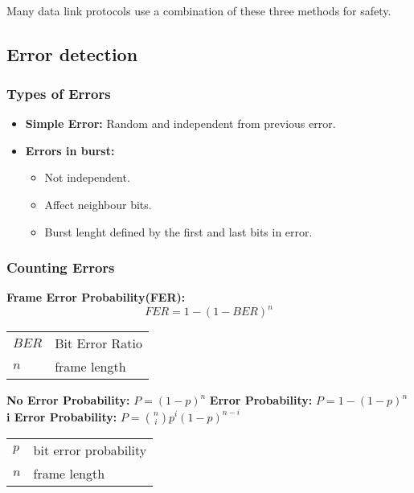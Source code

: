 \documentclass[../resumosRCOM.tex]{subfiles}
\makeatletter
\newenvironment{conditions}
  {\par\vspace{\abovedisplayskip}\noindent\begin{tabular}{>{$}l<{$} @{${}={}$} l}}
  {\end{tabular}\par\vspace{\belowdisplayskip}}
\makeatother
\begin{document}
\paragraph{}
Many data link protocols use a combination of these three methods for safety.

\subsection{Error detection}

\subsubsection{Types of Errors}
    \begin{itemize}
        \item \textbf{Simple Error: }Random and independent from previous error.
        \item \textbf{Errors in burst: } 
        \begin{itemize}
            \item Not independent.
            \item Affect neighbour bits.
            \item Burst lenght defined by the first and last bits in error.
        \end{itemize}
    \end{itemize}

\subsubsection{Counting Errors}

\textbf{Frame Error Probability(FER):} 
\begin{equation}
    {FER}= {1-(1- BER)^{n}} 
\end{equation}
\begin{conditions}
    BER & Bit Error Ratio \\
    n & frame length
\end{conditions}
 
\noindent
\newline
\textbf{No Error Probability: } ${P}= (1- p)^{n}$
\newline
\textbf{Error Probability: } ${P}= 1-(1- p)^{n}$ 
\newline
\textbf{i Error Probability: } ${P}= {{n}\choose{i}} p^{i}(1- p)^{n-i}$ 

\begin{conditions}
    p & bit error probability \\ 
    n & frame length \\
\end{conditions}
\end{document}
